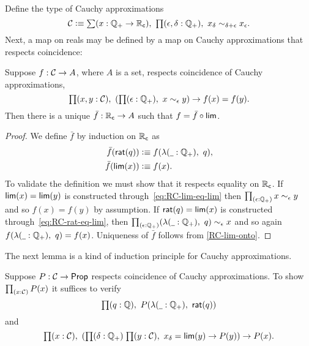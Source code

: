 \noindent
%
Define the type of Cauchy approximations
% 
\begin{equation}
  \CAP \defeq
  \sm{x : \Qp \to \RC} \prd{\epsilon, \delta : \Qp} x_\delta \sim_{\delta + \epsilon} x_\epsilon.
\end{equation}
% 
Next, a map on reals may be defined by a map on Cauchy approximations that respects
coincidence:

\begin{lem} \label{RC-lim-factor}
  Suppose $f : \mathcal{C} \to A$, where $A$ is a set, respects coincidence of Cauchy
  approximations,
  \begin{equation*}
    \prd{x, y : \CAP}
    \left( \prd{\epsilon : \Qp} x \sim_\epsilon y \right)
    \to f(x) = f(y).
  \end{equation*}
  Then there is a unique $\bar{f} : \mathbb{R}_\mathsf{c} \to A$ such that $f = \bar{f} \circ \mathsf{lim}$.
\end{lem}

\begin{proof}
  We define $\bar{f}$ by induction on $\mathbb{R}_\mathsf{c}$ as
  \begin{align*}
    \bar{f}(\rcrat(q)) &\defeq f(\lam{\blank : \Qp} q), \\
    \bar{f}(\rclim(x)) &\defeq f(x).
  \end{align*}
  To validate the definition we must show that it respects equality on $\mathbb{R}_\mathsf{c}$. If
  $\mathsf{lim}(x) = \mathsf{lim}(y)$ is constructed through~\eqref{eq:RC-lim-eq-lim} then
  $\prd{\epsilon : \Qp} x \sim_\epsilon y$ and so $f(x) = f(y)$ by assumption. If
  $\mathsf{rat}(q) = \mathsf{lim}(x)$ is constructed through~\eqref{eq:RC-rat-eq-lim}, then
  $\prd{\epsilon : \Qp} (\lam{\blank : \Qp} q) \sim_\epsilon x$ and so again
  $f(\lam{\blank : \Qp} q) = f(x)$.
  Uniqueness of $\bar{f}$ follows from \autoref{RC-lim-onto}.
\end{proof}

\noindent
The next lemma is a kind of induction principle for Cauchy approximations.

\begin{lem} \label{RC-seq-induction}
  Suppose $P : \mathcal{C} \to \mathsf{Prop}$ respects coincidence of Cauchy approximations. To show
  $\prd{x : \CAP} P(x)$ it suffices to verify
  \begin{equation} \label{eq:RC-seq-induction-i}
    \prd{q : \Q} P(\lam{\blank : \Qp} \rcrat(q))
  \end{equation}
  and
  \begin{equation} \label{eq:RC-seq-induction-ii}
    \prd{x : \CAP}
    \left(\prd{\delta : \Qp}{y : \CAP} x_\delta = \rclim(y) \to P(y) \right)
    \to P(x).
  \end{equation}
\end{lem}

